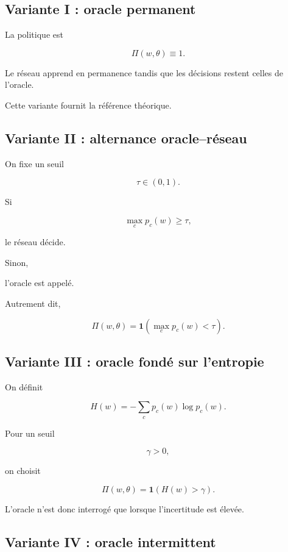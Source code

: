 \subsection{Variante I : oracle permanent}

La politique est

\[
\Pi(w,\theta)\equiv1.
\]

Le réseau apprend en permanence tandis que les décisions restent celles de
l'oracle.

Cette variante fournit la référence théorique.


\subsection{Variante II : alternance oracle--réseau}

On fixe un seuil

\[
\tau\in(0,1).
\]

Si

\[
\max_c p_c(w)\ge\tau,
\]

le réseau décide.

Sinon,

l'oracle est appelé.

Autrement dit,

\[
\Pi(w,\theta)
=
\mathbf1
\left(
\max_c p_c(w)<\tau
\right).
\]


\subsection{Variante III : oracle fondé sur l'entropie}

On définit

\[
H(w)
=
-
\sum_c
p_c(w)
\log p_c(w).
\]

Pour un seuil

\[
\gamma>0,
\]

on choisit

\[
\Pi(w,\theta)
=
\mathbf1
(H(w)>\gamma).
\]

L'oracle n'est donc interrogé que lorsque
l'incertitude est élevée.


\subsection{Variante IV : oracle intermittent}

